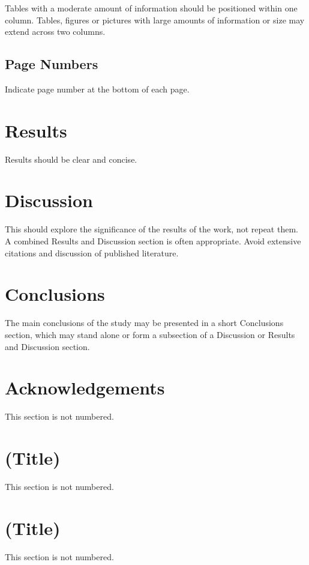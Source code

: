 \documentclass[twocolumn, 10pt]{article}
\begin{document}
Tables with a moderate amount of information should be positioned within one column. Tables, figures or pictures with large amounts of information or size may extend across two columns.

\subsection{Page Numbers}
Indicate page number at the bottom of each page.

\section{Results}
Results should be clear and concise.

\section{Discussion}
This should explore the significance of the results of the work, not repeat them. A combined Results and Discussion section is often appropriate. Avoid extensive citations and discussion of published literature.

\section{Conclusions}
The main conclusions of the study may be presented in a short Conclusions section, which may stand alone or form a subsection of a Discussion or Results and Discussion section.

\section*{Acknowledgements}
This section is not numbered.

\appendix
{}
\setcounter{equation}{0}
\renewcommand\theequation{A.\arabic{equation}}

\section{(Title)}
This section is not numbered.

\section{(Title)}
This section is not numbered.
\end{document}

